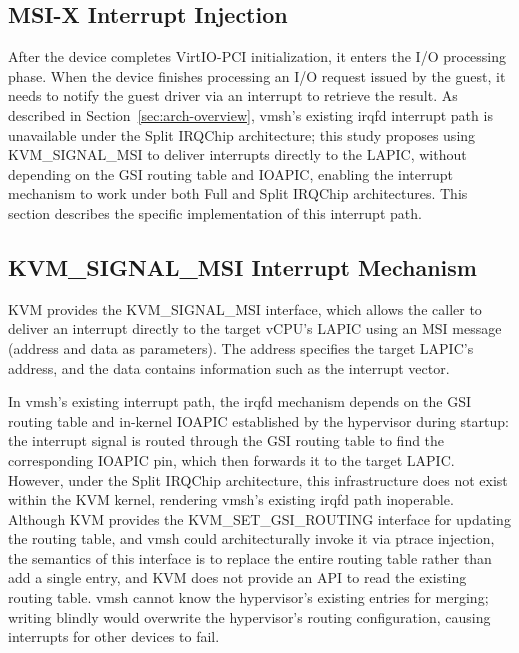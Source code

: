\begin{ZhChapter}
\section{MSI-X Interrupt Injection}
\label{sec:msix-injection}

After the device completes VirtIO-PCI initialization, it enters the I/O processing phase. When the device finishes processing an I/O request issued by the guest, it needs to notify the guest driver via an interrupt to retrieve the result. As described in Section~\ref{sec:arch-overview}, vmsh's existing irqfd interrupt path is unavailable under the Split IRQChip architecture; this study proposes using KVM\_SIGNAL\_MSI to deliver interrupts directly to the LAPIC, without depending on the GSI routing table and IOAPIC, enabling the interrupt mechanism to work under both Full and Split IRQChip architectures. This section describes the specific implementation of this interrupt path.

\subsection{KVM\_SIGNAL\_MSI Interrupt Mechanism}
\label{sec:kvm-signal-msi}

KVM provides the KVM\_SIGNAL\_MSI interface, which allows the caller to deliver an interrupt directly to the target vCPU's LAPIC using an MSI message (address and data as parameters). The address specifies the target LAPIC's address, and the data contains information such as the interrupt vector.

\begin{sloppypar}
In vmsh's existing interrupt path, the irqfd mechanism depends on the GSI routing table and in-kernel IOAPIC established by the hypervisor during startup: the interrupt signal is routed through the GSI routing table to find the corresponding IOAPIC pin, which then forwards it to the target LAPIC. However, under the Split IRQChip architecture, this infrastructure does not exist within the KVM kernel, rendering vmsh's existing irqfd path inoperable. Although KVM provides the KVM\_SET\_GSI\_ROUTING interface for updating the routing table, and vmsh could architecturally invoke it via ptrace injection, the semantics of this interface is to replace the entire routing table rather than add a single entry, and KVM does not provide an API to read the existing routing table. vmsh cannot know the hypervisor's existing entries for merging; writing blindly would overwrite the hypervisor's routing configuration, causing interrupts for other devices to fail.
\end{sloppypar}


\end{ZhChapter}
